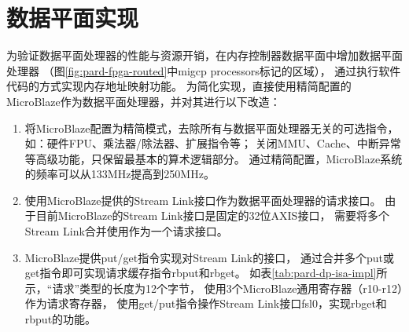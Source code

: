 \section{数据平面实现}

为验证数据平面处理器的性能与资源开销，在内存控制器数据平面中增加数据平面处理器
（图\ref{fig:pard-fpga-routed}中migcp processors标记的区域），
通过执行软件代码的方式实现内存地址映射功能。
为简化实现，直接使用精简配置的MicroBlaze作为数据平面处理器，并对其进行以下改造：

\begin{enumerate}[leftmargin=2\parindent, nolistsep, label=\arabic*）]
  \item 将MicroBlaze配置为精简模式，去除所有与数据平面处理器无关的可选指令，
        如：硬件FPU、乘法器/除法器、扩展指令等；
        关闭MMU、Cache、中断异常等高级功能，只保留最基本的算术逻辑部分。
        通过精简配置，MicroBlaze系统的频率可以从133MHz提高到250MHz。
  \item 使用MicroBlaze提供的Stream Link接口作为数据平面处理器的请求接口。
        由于目前MicroBlaze的Stream Link接口是固定的32位AXIS接口，
        需要将多个Stream Link合并使用作为一个请求接口。
  \item MicroBlaze提供put/get指令实现对Stream Link的接口，
        通过合并多个put或get指令即可实现请求缓存指令rbput和rbget。
        如表\ref{tab:pard-dp-isa-impl}所示，``请求''类型的长度为12个字节，
        使用3个MicroBlaze通用寄存器（r10-r12）作为请求寄存器，
        使用get/put指令操作Stream Link接口fsl0，实现rbget和rbput的功能。
\end{enumerate}

